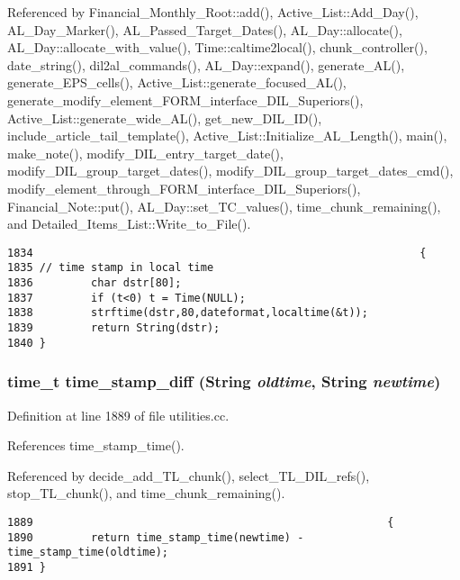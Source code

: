 Referenced by Financial\_\-Monthly\_\-Root::add(), Active\_\-List::Add\_\-Day(), AL\_\-Day\_\-Marker(), AL\_\-Passed\_\-Target\_\-Dates(), AL\_\-Day::allocate(), AL\_\-Day::allocate\_\-with\_\-value(), Time::caltime2local(), chunk\_\-controller(), date\_\-string(), dil2al\_\-commands(), AL\_\-Day::expand(), generate\_\-AL(), generate\_\-EPS\_\-cells(), Active\_\-List::generate\_\-focused\_\-AL(), generate\_\-modify\_\-element\_\-FORM\_\-interface\_\-DIL\_\-Superiors(), Active\_\-List::generate\_\-wide\_\-AL(), get\_\-new\_\-DIL\_\-ID(), include\_\-article\_\-tail\_\-template(), Active\_\-List::Initialize\_\-AL\_\-Length(), main(), make\_\-note(), modify\_\-DIL\_\-entry\_\-target\_\-date(), modify\_\-DIL\_\-group\_\-target\_\-dates(), modify\_\-DIL\_\-group\_\-target\_\-dates\_\-cmd(), modify\_\-element\_\-through\_\-FORM\_\-interface\_\-DIL\_\-Superiors(), Financial\_\-Note::put(), AL\_\-Day::set\_\-TC\_\-values(), time\_\-chunk\_\-remaining(), and Detailed\_\-Items\_\-List::Write\_\-to\_\-File().



\footnotesize\begin{verbatim}1834                                                            {
1835 // time stamp in local time
1836         char dstr[80];
1837         if (t<0) t = Time(NULL);
1838         strftime(dstr,80,dateformat,localtime(&t));
1839         return String(dstr);
1840 }
\end{verbatim}\normalsize 
{}
\subsubsection{\setlength{\rightskip}{0pt plus 5cm}time\_\-t time\_\-stamp\_\-diff ({\bf String} {\em oldtime}, {\bf String} {\em newtime})}\label{dil2al_8hh_a224}




Definition at line 1889 of file utilities.cc.

References time\_\-stamp\_\-time().

Referenced by decide\_\-add\_\-TL\_\-chunk(), select\_\-TL\_\-DIL\_\-refs(), stop\_\-TL\_\-chunk(), and time\_\-chunk\_\-remaining().



\footnotesize\begin{verbatim}1889                                                       {
1890         return time_stamp_time(newtime) - time_stamp_time(oldtime);
1891 }
\end{verbatim}\normalsize 
{}
